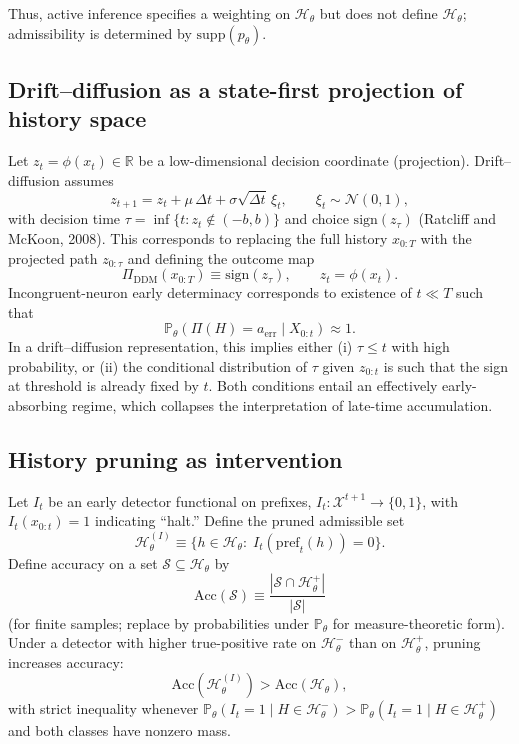 \documentclass[11pt]{article}
\newcommand{\histories}{\mathcal{H}}
\begin{document}
Thus, active inference specifies a weighting on $\histories_\theta$ but does not define $\histories_\theta$; admissibility is determined by $\mathrm{supp}(p_\theta)$.

\subsection{Drift--diffusion as a state-first projection of history space}

Let $z_t=\phi(x_t)\in\mathbb{R}$ be a low-dimensional decision coordinate (projection). Drift--diffusion assumes
\[
z_{t+1}=z_t+\mu\,\Delta t+\sigma\sqrt{\Delta t}\,\xi_t,\qquad \xi_t\sim\mathcal{N}(0,1),
\]
with decision time $\tau=\inf\{t: z_t\notin(-b,b)\}$ and choice $\mathrm{sign}(z_\tau)$ (Ratcliff and McKoon, 2008). This corresponds to replacing the full history $x_{0:T}$ with the projected path $z_{0:\tau}$ and defining the outcome map
\[
\Pi_{\mathrm{DDM}}(x_{0:T}) \equiv \mathrm{sign}\!\left(z_\tau\right),\qquad z_t=\phi(x_t).
\]
Incongruent-neuron early determinacy corresponds to existence of $t\ll T$ such that
\[
\mathbb{P}_\theta(\Pi(H)=a_{\mathrm{err}}\mid X_{0:t})\approx 1.
\]
In a drift--diffusion representation, this implies either (i) $\tau\le t$ with high probability, or (ii) the conditional distribution of $\tau$ given $z_{0:t}$ is such that the sign at threshold is already fixed by $t$. Both conditions entail an effectively early-absorbing regime, which collapses the interpretation of late-time accumulation.

\subsection{History pruning as intervention}

Let $I_t$ be an early detector functional on prefixes, $I_t:\mathcal{X}^{t+1}\to\{0,1\}$, with $I_t(x_{0:t})=1$ indicating “halt.” Define the pruned admissible set
\[
\histories_\theta^{(I)} \equiv \{h\in\histories_\theta:\; I_t(\mathrm{pref}_t(h))=0\}.
\]
Define accuracy on a set $\mathcal{S}\subseteq\histories_\theta$ by
\[
\mathrm{Acc}(\mathcal{S})\equiv \frac{|\mathcal{S}\cap \histories_\theta^{+}|}{|\mathcal{S}|}
\]
(for finite samples; replace by probabilities under $\mathbb{P}_\theta$ for measure-theoretic form). Under a detector with higher true-positive rate on $\histories_\theta^{-}$ than on $\histories_\theta^{+}$, pruning increases accuracy:
\[
\mathrm{Acc}(\histories_\theta^{(I)}) > \mathrm{Acc}(\histories_\theta),
\]
with strict inequality whenever $\mathbb{P}_\theta(I_t=1\mid H\in\histories_\theta^{-})>\mathbb{P}_\theta(I_t=1\mid H\in\histories_\theta^{+})$ and both classes have nonzero mass.
\end{document}
